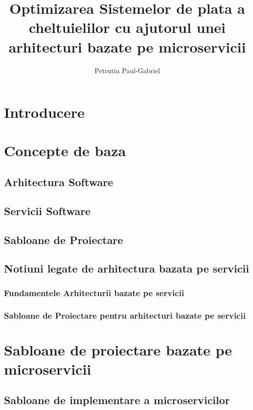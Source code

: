 \documentclass[11pt,titlepage]{article}
\begin{document}
\title{Optimizarea Sistemelor de plata a cheltuielilor cu ajutorul unei arhitecturi bazate pe microservicii}
\author{Petrutiu Paul-Gabriel} 

\maketitle

\tableofcontents
\cleardoublepage

\section{Introducere} 
 
\section{Concepte de baza} 
  \subsection{Arhitectura Software}
  \subsection{Servicii Software}
  \subsection{Sabloane de Proiectare}
  \subsection{Notiuni legate de arhitectura bazata pe servicii}
  \subsubsection{Fundamentele Arhitecturii bazate pe servicii}
  \subsubsection{Sabloane de Proiectare pentru arhitecturi bazate pe servicii}
  
\section{Sabloane de proiectare bazate pe microservicii}
	\subsection{Sabloane de implementare a microservicilor}
\end{document}
